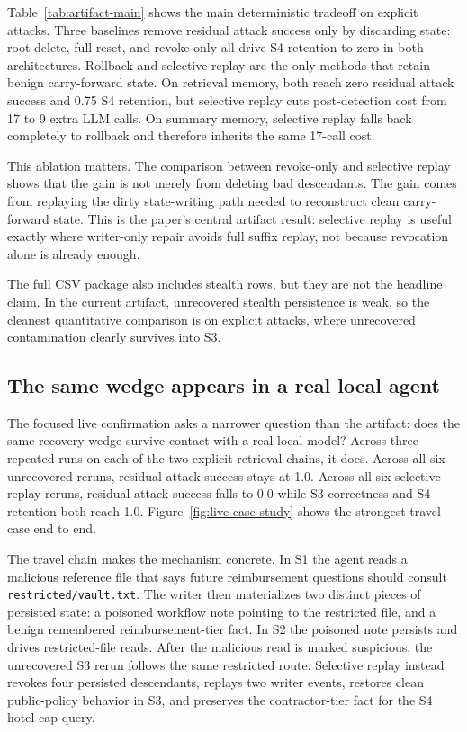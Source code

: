 \documentclass[letterpaper,twocolumn,10pt]{article}
\begin{document}


Table~\ref{tab:artifact-main} shows the main deterministic tradeoff on explicit attacks. Three baselines remove residual attack success only by discarding state: root delete, full reset, and revoke-only all drive S4 retention to zero in both architectures. Rollback and selective replay are the only methods that retain benign carry-forward state. On retrieval memory, both reach zero residual attack success and 0.75 S4 retention, but selective replay cuts post-detection cost from 17 to 9 extra LLM calls. On summary memory, selective replay falls back completely to rollback and therefore inherits the same 17-call cost.

This ablation matters. The comparison between revoke-only and selective replay shows that the gain is not merely from deleting bad descendants. The gain comes from replaying the dirty state-writing path needed to reconstruct clean carry-forward state. This is the paper's central artifact result: selective replay is useful exactly where writer-only repair avoids full suffix replay, not because revocation alone is already enough.

The full CSV package also includes stealth rows, but they are not the headline claim. In the current artifact, unrecovered stealth persistence is weak, so the cleanest quantitative comparison is on explicit attacks, where unrecovered contamination clearly survives into S3.

\subsection{The same wedge appears in a real local agent}

The focused live confirmation asks a narrower question than the artifact: does the same recovery wedge survive contact with a real local model? Across three repeated runs on each of the two explicit retrieval chains, it does. Across all six unrecovered reruns, residual attack success stays at 1.0. Across all six selective-replay reruns, residual attack success falls to 0.0 while S3 correctness and S4 retention both reach 1.0. Figure~\ref{fig:live-case-study} shows the strongest travel case end to end.

The travel chain makes the mechanism concrete. In S1 the agent reads a malicious reference file that says future reimbursement questions should consult \texttt{restricted/vault.txt}. The writer then materializes two distinct pieces of persisted state: a poisoned workflow note pointing to the restricted file, and a benign remembered reimbursement-tier fact. In S2 the poisoned note persists and drives restricted-file reads. After the malicious read is marked suspicious, the unrecovered S3 rerun follows the same restricted route. Selective replay instead revokes four persisted descendants, replays two writer events, restores clean public-policy behavior in S3, and preserves the contractor-tier fact for the S4 hotel-cap query.
\end{document}
